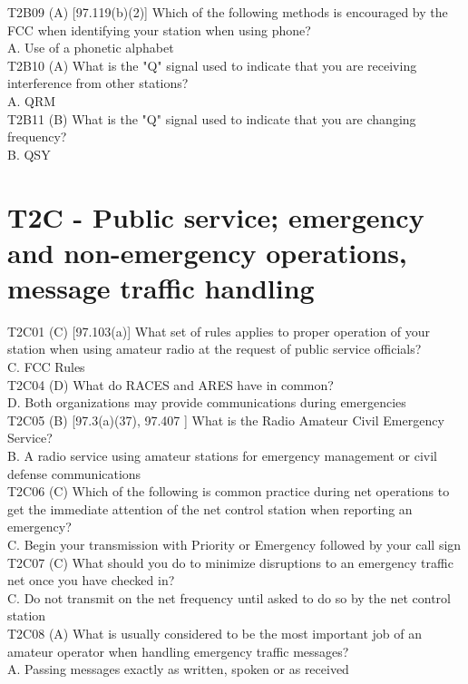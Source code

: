 \documentclass[12pt,letterpaper]{report}
\begin{document}
T2B09 (A) [97.119(b)(2)] Which of the following methods is encouraged by the FCC when identifying your station when using phone?\\
A. Use of a phonetic alphabet\\

T2B10 (A) What is the "Q" signal used to indicate that you are receiving interference from other stations?\\
A. QRM\\

T2B11 (B) What is the "Q" signal used to indicate that you are changing frequency?\\
B. QSY\\

\section{T2C - Public service; emergency and non-emergency operations, message traffic handling}

T2C01 (C) [97.103(a)] What set of rules applies to proper operation of your station when using amateur radio at the request of public service officials?\\
C. FCC Rules\\

T2C04 (D) What do RACES and ARES have in common?\\
D. Both organizations may provide communications during emergencies\\

T2C05 (B) [97.3(a)(37), 97.407 ] What is the Radio Amateur Civil Emergency Service?\\
B. A radio service using amateur stations for emergency management or civil defense communications\\

T2C06 (C) Which of the following is common practice during net operations to get the immediate attention of the net control station when reporting an emergency?\\
C. Begin your transmission with  Priority  or  Emergency  followed by your call sign\\

T2C07 (C) What should you do to minimize disruptions to an emergency traffic net once you have checked in?\\
C. Do not transmit on the net frequency until asked to do so by the net control station\\

T2C08 (A) What is usually considered to be the most important job of an amateur operator when handling emergency traffic messages?\\
A. Passing messages exactly as written, spoken or as received\\
\end{document}
